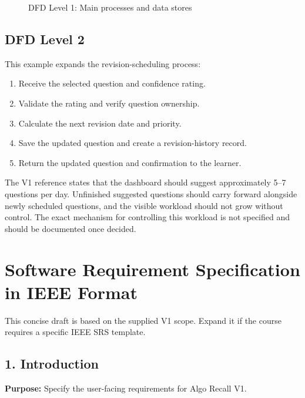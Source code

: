 \documentclass[12pt,a4paper]{report}
\begin{document}
\begin{figure}[htbp]

\caption{DFD Level 1: Main processes and data stores}
\label{fig:dfd1}
\end{figure}


\subsection{DFD Level 2}
This example expands the revision-scheduling process:
\begin{enumerate}
\item Receive the selected question and confidence rating.
\item Validate the rating and verify question ownership.
\item Calculate the next revision date and priority.
\item Save the updated question and create a revision-history record.
\item Return the updated question and confirmation to the learner.
\end{enumerate}

The V1 reference states that the dashboard should suggest approximately 5--7 questions per
day. Unfinished suggested questions should carry forward alongside newly scheduled
questions, and the visible workload should not grow without control. The exact mechanism
for controlling this workload is not specified and should be documented once decided.

\section{Software Requirement Specification in IEEE Format}
This concise draft is based on the supplied V1 scope. Expand it if the course requires a
specific IEEE SRS template.

\subsection*{1. Introduction}
\textbf{Purpose:} Specify the user-facing requirements for Algo Recall V1.
\end{document}
